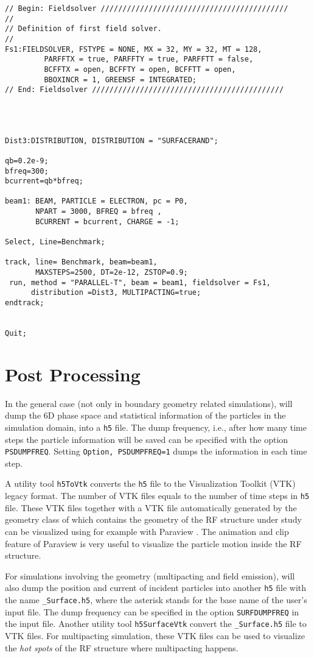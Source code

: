 \documentclass[a4paper,11pt]{article}
\begin{document}
\begin{verbatim}
// Begin: Fieldsolver ///////////////////////////////////////////
//
// Definition of first field solver.
//
Fs1:FIELDSOLVER, FSTYPE = NONE, MX = 32, MY = 32, MT = 128,
		 PARFFTX = true, PARFFTY = true, PARFFTT = false,
		 BCFFTX = open, BCFFTY = open, BCFFTT = open,
		 BBOXINCR = 1, GREENSF = INTEGRATED;
// End: Fieldsolver ////////////////////////////////////////////




Dist3:DISTRIBUTION, DISTRIBUTION = "SURFACERAND"; 

qb=0.2e-9;
bfreq=300;
bcurrent=qb*bfreq;

beam1: BEAM, PARTICLE = ELECTRON, pc = P0, 
       NPART = 3000, BFREQ = bfreq , 
       BCURRENT = bcurrent, CHARGE = -1;

Select, Line=Benchmark;

track, line= Benchmark, beam=beam1, 
       MAXSTEPS=2500, DT=2e-12, ZSTOP=0.9;  
 run, method = "PARALLEL-T", beam = beam1, fieldsolver = Fs1, 
      distribution =Dist3, MULTIPACTING=true;
endtrack;


Quit;
\end{verbatim}
\section{Post Processing}
In the general case (not only in boundary geometry related simulations), \opal will dump the $6$D phase space and statistical information of the particles in the simulation domain, into a {\tt h5} file. The dump frequency, i.e., after how many time steps the particle information will be saved can be specified with the option {\tt PSDUMPFREQ}. Setting {\tt Option, PSDUMPFREQ=1} dumps the information in each time step. 

A utility tool {\tt h5ToVtk}  converts the {\tt h5} file to the Visualization Toolkit (VTK) legacy format. The number of VTK files equals to the number of time steps in {\tt h5} file. These VTK files together with a VTK file automatically generated by the geometry class of \opal which contains the geometry of the RF structure under study can be visualized using for example with Paraview \cite{paraview}. The animation and clip feature of Paraview is very useful to visualize the particle motion inside the RF structure. 

For simulations involving the geometry (multipacting and field emission), \opal will also dump the position and current of incident particles into another {\tt h5} file with the name {\tt *\_Surface.h5}, where the asterisk stands for the base name of the user's \opal input file. The dump frequency can be specified in the option {\tt SURFDUMPFREQ} in the \opal input file. Another utility tool {\tt h5SurfaceVtk}  convert the {\tt *\_Surface.h5}  file to VTK files. For multipacting simulation, these VTK files can be used to visualize the {\em hot spots} of the RF structure where multipacting happens. 
\end{document}
